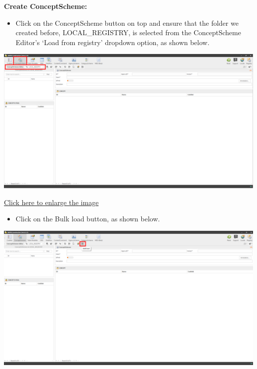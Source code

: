 \documentclass[
]{book}
\providecommand{\tightlist}{%
  \setlength{\itemsep}{0pt}\setlength{\parskip}{0pt}}
\theoremstyle{definition}
\theoremstyle{definition}
\theoremstyle{definition}
\theoremstyle{definition}
\theoremstyle{remark}
\begin{document}
\textbf{Create ConceptScheme:}

\begin{itemize}
\tightlist
\item
  Click on the ConceptScheme button on top and ensure that the folder we created before, LOCAL\_REGISTRY, is selected from the ConceptScheme Editor's `Load from registry' dropdown option, as shown below.
\end{itemize}

\begin{center}\includegraphics[width=1\linewidth]{./images/image100} \end{center}

\href{images/image100.png}{Click here to enlarge the image}

\begin{itemize}
\tightlist
\item
  Click on the Bulk load button, as shown below.
\end{itemize}

\begin{center}\includegraphics[width=1\linewidth]{./images/image102} \end{center}
\end{document}
